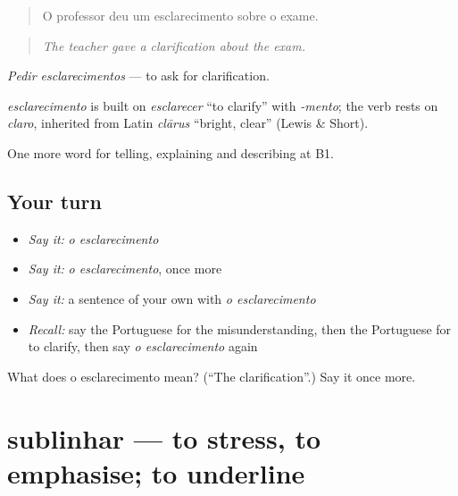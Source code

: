 \begin{quote}
O professor deu um esclarecimento sobre o exame.
\end{quote}

\begin{quote}
\emph{The teacher gave a clarification about the exam.}
\end{quote}

\emph{Pedir esclarecimentos} — to ask for clarification.

\begin{cousinweb}
\emph{esclarecimento} is built on \emph{esclarecer} \textquotedblleft{}to clarify\textquotedblright{} with \emph{-mento}; the verb rests on \emph{claro}, inherited from Latin \emph{clārus} \textquotedblleft{}bright, clear\textquotedblright{} (Lewis \& Short).
\end{cousinweb}

\begin{grammarlens}[title={What you've built}]
One more word for telling, explaining and describing at B1.
\end{grammarlens}

\subsection*{Your turn}
\begin{itemize}
\raggedright
  \item \emph{Say it:} \emph{o esclarecimento}
  \item \emph{Say it:} \emph{o esclarecimento}, once more
  \item \emph{Say it:} a sentence of your own with \emph{o esclarecimento}
  \item \emph{Recall:} say the Portuguese for the misunderstanding, then the Portuguese for to clarify, then say \emph{o esclarecimento} again
\end{itemize}

\begin{tcolorbox}[breakable,colback=teal!4,colframe=teal!35!black,title={Before you move on}]
What does o esclarecimento mean? (\textquotedblleft{}The clarification\textquotedblright{}.) Say it once more.
\end{tcolorbox}
\section[sublinhar]{sublinhar — to stress, to emphasise; to underline}

\label{lesson:PT-C343-sublinhar}



